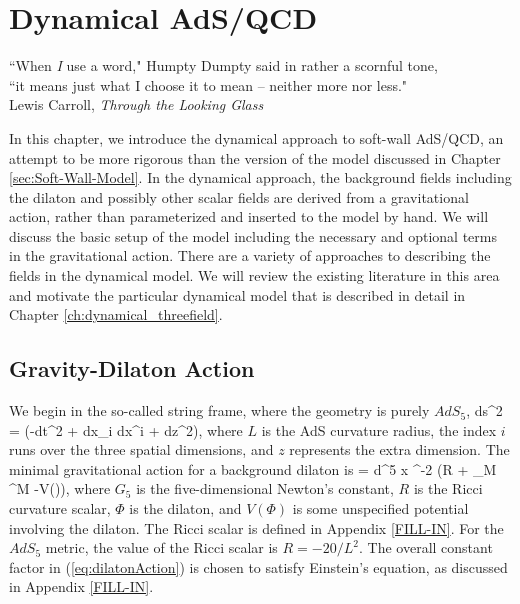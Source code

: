 \chapter{Dynamical AdS/QCD}
\label{ch:dynamical}

\begin{flushright}
``When \emph{I} use a word," Humpty Dumpty said in rather a scornful tone,\\
 ``it means just what I choose it to mean -- neither more nor less." \\
Lewis Carroll, \emph{Through the Looking Glass}
\end{flushright}

In this chapter, we introduce the dynamical approach to soft-wall AdS/QCD, an attempt to be more rigorous than the version of the model discussed in Chapter \ref{sec:Soft-Wall-Model}.
In the dynamical approach, the background fields including the dilaton and possibly other scalar fields are derived from a gravitational action, rather than parameterized and inserted to the model by hand.
We will discuss the basic setup of the model including the necessary and optional terms in the gravitational action.
There are a variety of approaches to describing the fields in the dynamical model.
We will review the existing literature in this area and motivate the particular dynamical model that is described in detail in Chapter \ref{ch:dynamical_threefield}.

\section{Gravity-Dilaton Action}
\label{sec:gravity-dilaton}

We begin in the so-called string frame, where the geometry is purely $AdS_5$, 
\be
ds^2 = (-dt^2 + dx_i dx^i + dz^2),
\label{eq:AdSmetricdynamical}
\ee
where $L$ is the AdS curvature radius, the index $i$ runs over the three spatial dimensions, and $z$ represents the extra dimension.
The minimal gravitational action for a background dilaton is
\be
{} = \int d^5 x \root \EXP^{-2\Phi} \left(R + \partial_M \Phi \partial^M \Phi -V(\Phi)\right),
\label{eq:dilatonAction}
\ee
where $G_5$ is the five-dimensional Newton's constant, $R$ is the Ricci curvature scalar, $\Phi$ is the dilaton, and $V(\Phi)$ is some unspecified potential involving the dilaton.
The Ricci scalar is defined in Appendix \ref{FILL-IN}. 
For the $AdS_5$ metric, the value of the Ricci scalar is $R=-20/L^2$.
The overall constant factor in (\ref{eq:dilatonAction}) is chosen to satisfy Einstein's equation, as discussed in Appendix \ref{FILL-IN}.

